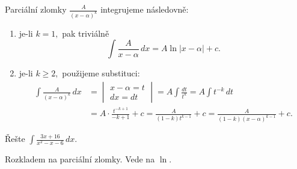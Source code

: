 \begin{pozn}
    Parciální zlomky $\frac{A}{(x-\alpha)^k}$ integrujeme následovně:
    \begin{enumerate}[$i.$]
    \item je-li $k=1,$ pak triviálně
    $$\int \frac{A}{x-\alpha} \, dx = A\ln |x-\alpha|+c.$$
   	\item je-li $k\geq 2,$ použijeme substituci:
    \begin{align*}
    \int \frac{A}{(x-\alpha)^k}\, dx &=\begin{vmatrix}
      x-\alpha=t \\
      dx = dt
  \end{vmatrix}=A\int \frac{dt}{t^k}=A\int t^{-k}\, dt \\
 & = A\cdot \frac{t^{-k+1}}{-k+1}+c=\frac{A}{(1-k)t^{k-1}}+c=\frac{A}{(1-k)(x-\alpha)^{k-1}}+c.
    \end{align*}
    \end{enumerate}
\end{pozn}

\begin{priklad}
Řešte $\int \frac{3x+16}{x^2-x-6}\, dx$.
\end{priklad}

\begin{reseni}
Rozkladem na parciální zlomky. Vede na $\ln$.
\end{reseni}

